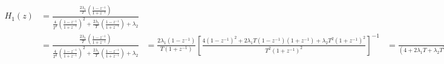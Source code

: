 
$\begin{align}

H_1(z) &= \frac{\frac{2\lambda_1}{T}\left(\frac{1-z^{-1}}{1+z^{-1}}\right)}{\frac{4}{T^2}\left(\frac{1-z^{-1}}{1+z^{-1}}\right)^2 + \frac{2\lambda_1}{T}\left(\frac{1-z^{-1}}{1+z^{-1}}\right) + \lambda_2} \\
       &= \frac{\frac{2\lambda_1}{T}\left(\frac{1-z^{-1}}{1+z^{-1}}\right)}
               {\frac{4}{T^2}\left(\frac{1-z^{-1}}{1+z^{-1}}\right)^2 + \frac{2\lambda_1}{T}\left(\frac{1-z^{-1}}{1+z^{-1}}\right) + \lambda_2}
       &= \frac{2\lambda_1 (1 -z^{-1})}{T(1 +z^{-1})}
          \left[
            \frac{ 4\left(1-z^{-1}\right)^2 +2\lambda_1T\left(1-z^{-1}\right)\left(1+z^{-1}\right) +\lambda_2T^2\left(1+z^{-1}\right)^2 }
                 {T^2\left(1+z^{-1}\right)^2}
            \right]^{-1}
       &= \frac{2\lambda_1T(1-z^{-2}}
               {\left(4 +2\lambda_1T +\lambda_2T^2\right) + z^{-1}\left(2\lambda_2T^2 -8\right) + z^{-2}\left(\lambda_2T^2 -2\lambda_1T +4\right)}
\end{align}$
